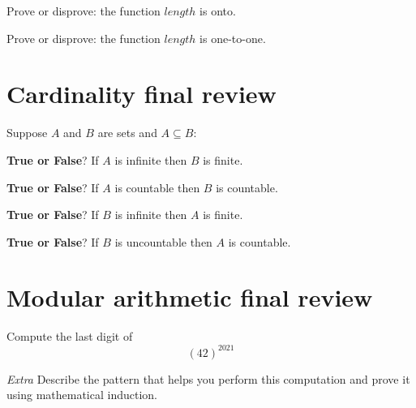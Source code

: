 \documentclass[12pt, oneside]{article}
\begin{document}
Prove or disprove: the function $length$ is onto.

\vfill

Prove or disprove: the function $length$ is one-to-one.

\vfill
 \vfill
\section*{Cardinality final review}


Suppose $A$ and $B$ are sets and $A \subseteq B$:

{\bf True or False}?  If $A$ is infinite then $B$ is finite.

\vspace{50pt}

{\bf True or False}?  If $A$ is countable then $B$ is countable.

\vspace{50pt}

{\bf True or False}?  If $B$ is infinite then $A$ is finite.

\vspace{50pt}

{\bf True or False}?  If $B$ is uncountable then $A$ is countable.

\vspace{50pt} \vfill
\section*{Modular arithmetic final review}


Compute the last digit of 
\[
    (42)^{2021}
\]

\vfill

{\it Extra} Describe the pattern that helps you perform this computation 
and prove it using mathematical induction. \vfill
\end{document}
